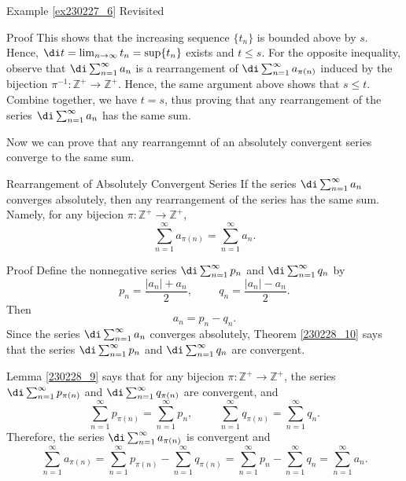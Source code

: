 \begin{example}{\linkt Example \ref{ex230227_6} Revisited}
\begin{example}[label=ex230227_13]{}
\begin{myproof}{Proof}
This shows that the increasing sequence $\{t_n\}$ is bounded above by $s$. Hence, $\di t=\lim_{n\to \infty}t_n=\sup\{t_n\}$ exists and $t\leq s$. For the  opposite inequality, observe that 
$\di\sum_{n=1}^{\infty}a_{n}$ is a rearrangement of $\di\sum_{n=1}^{\infty}a_{\pi(n)}$ induced by the bijection $\pi^{-1}:\mathbb{Z}^+\to\mathbb{Z}^+$. Hence, the same argument above shows that $s\leq t$. Combine together, we have $t=s$, thus proving that any rearrangement of the series $\di \sum_{n=1}^{\infty}a_{n}$ has the same sum.

\end{myproof}

Now we can prove that any rearrangemnt of an absolutely convergent series converge to the same sum.
\begin{theorem}{Rearrangement of Absolutely Convergent Series}
If  the series $\di\sum_{n=1}^{\infty}a_n$   converges absolutely, then any rearrangement of the series has the same sum. Namely, for any bijecion $\pi:\mathbb{Z}^+\to\mathbb{Z}^+$, 
\[\sum_{n=1}^{\infty}a_{\pi(n)}=\sum_{n=1}^{\infty}a_n.\]
\end{theorem}\begin{myproof}{Proof}
Define the nonnegative series $\di\sum_{n=1}^{\infty}p_n$ and $\di\sum_{n=1}^{\infty}q_n$ by 
\[p_n=\frac{|a_n|+a_n}{2},\hspace{1cm}q_n=\frac{|a_n|-a_n}{2}.\]
Then
\[a_n=p_n-q_n.\]
Since  the series $\di\sum_{n=1}^{\infty}a_n$   converges absolutely, Theorem \ref{230228_10} says that the series  $\di\sum_{n=1}^{\infty}p_n$ and $\di\sum_{n=1}^{\infty}q_n$  are convergent.


 Lemma \ref{230228_9} says that  for any bijecion $\pi:\mathbb{Z}^+\to\mathbb{Z}^+$, the  series $\di\sum_{n=1}^{\infty}p_{\pi(n)}$ and $\di\sum_{n=1}^{\infty}q_{\pi(n)}$ are convergent, and
\[\sum_{n=1}^{\infty}p_{\pi(n)}=\sum_{n=1}^{\infty}p_n,\hspace{1cm} \sum_{n=1}^{\infty}q_{\pi(n)}=\sum_{n=1}^{\infty}q_n.\]Therefore, the series $\di\sum_{n=1}^{\infty}a_{\pi(n)}$ is convergent and
\[\sum_{n=1}^{\infty}a_{\pi(n)}=\sum_{n=1}^{\infty}p_{\pi(n)}-\sum_{n=1}^{\infty}q_{\pi(n)}=\sum_{n=1}^{\infty}p_{n}-\sum_{n=1}^{\infty}q_{n}=\sum_{n=1}^{\infty}a_n.\]
\end{myproof}


\end{example}
\end{example}
